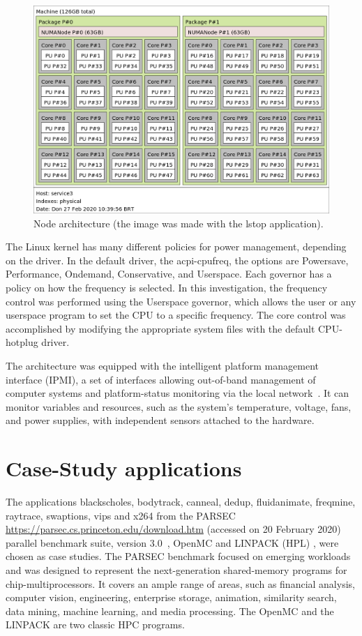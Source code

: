 \begin{figure}[H]
\centering
\includegraphics[width=\columnwidth]{models/figures/architecture.png}
\caption{Node architecture (the image was made with the lstop application).}
\label{fig:architecture}
\end{figure}

The Linux kernel has many different policies for power management, depending on the driver. In the default driver, the acpi-cpufreq, the options are Powersave, Performance, Ondemand, Conservative, and Userspace. Each governor has a policy on how the frequency is selected. In this investigation, the frequency control was performed using the Userspace governor, which allows the user or any userspace program to set the CPU to a specific frequency. The core control was accomplished by modifying the appropriate system files with the default CPU-hotplug driver.

The architecture was equipped with the intelligent platform management interface (IPMI), a set of interfaces allowing out-of-band management of computer systems and platform-status monitoring via the local network~\cite{Schwenkler2006IntelligentInterface}. It can monitor variables and resources, such as the system's temperature, voltage, fans, and power supplies, with independent sensors attached to the hardware.

\section{Case-Study applications} \label{sec:casestudyapplication}
The applications blackscholes, bodytrack, canneal, dedup, fluidanimate, freqmine, raytrace, swaptions, vips and x264 from the PARSEC \url{https://parsec.cs.princeton.edu/download.htm} (accessed on 20 February  2020) parallel benchmark suite, version 3.0~\cite{Bienia2008TheSuite}, OpenMC \cite{Romano2015OpenMC:Development} and LINPACK (HPL) \cite{Dongarra1988TheExplanation}, were chosen as case studies. The PARSEC benchmark focused on emerging workloads and was designed to represent the next-generation shared-memory programs for chip-multiprocessors. It covers an ample range of areas, such as financial analysis, computer vision, engineering, enterprise storage, animation, similarity search, data mining, machine learning, and media processing. The OpenMC and the LINPACK are two classic HPC programs.
